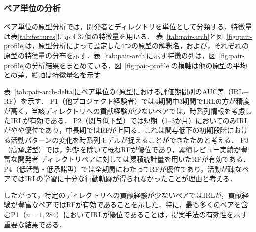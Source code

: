 \documentclass[submit,noauthor,ses,dvipdfmx]{ipsj}
\newcommand{\todo}[1]{\colorbox{yellow}{{\bf TODO}:}{\color{red} {\textbf{[#1]}}}}
\begin{document}
\subsubsection{ペア単位の分析}\label{sec:pair-arch}

ペア単位の原型分析では，開発者とディレクトリを単位として分類する．特徴量は表\ref{tab:features}に示す37個の特徴量を用いる．
表~\ref{tab:pair-arch}と図~\ref{fig:pair-profile}は，原型分析によって設定した4つの原型の解釈名，および，それぞれの原型の特徴量の分布を示す．表~\ref{tab:pair-arch}に示す特徴の列は，図~\ref{fig:pair-profile}の分析結果をまとめている．図~\ref{fig:pair-profile}の横軸は他の原型の平均との差，縦軸は特徴量名を示す．

表~\ref{tab:pair-arch-delta}にペア単位の4原型における評価期間別のAUC差（IRL$-$RF）を示す．
P1（他プロジェクト経験者）では4期間中3期間でIRLの方が精度が高く，当該ディレクトリへの貢献経験が少ないペアでは，時系列情報を考慮したIRLが有効である．
P2（関与低下型）では短期（1--3か月）においてのみIRLがやや優位であり，中長期ではRFが上回る．これは関与低下の初期段階における活動パターンの変化を時系列モデルが捉えることができたためと考える．
P3（高承諾型）では，短期を除いて概ねRFが優位であり，累積レビュー実績が豊富な開発者-ディレクトリペアに対しては累積統計量を用いたRFが有効である．
P4（低活動・低承諾型）では全期間にわたってRFが優位であり，活動が疎なペアではIRLの学習に十分な行動軌跡が得られなかったことが理由と考える．

したがって，特定のディレクトリへの貢献経験が少ないペアではIRLが，貢献経験が豊富なペアではRFが有効であることを示した．特に，最も多くのペアを含むP1（$n = 1{,}284$）においてIRLが優位であることは，提案手法の有効性を示す重要な結果である．




\end{document}
